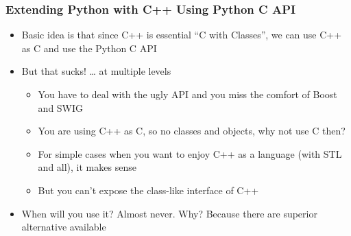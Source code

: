 \documentclass{beamer}
\begin{document}
\begin{frame}
\frametitle{Extending Python with C++ Using Python C API}
\label{sec-1_4}


\begin{itemize}
\item Basic idea is that since C++ is essential ``C with Classes'', we can use C++ as C and use the Python C API
\item But that sucks! \ldots{} at multiple levels
\begin{itemize}
\item You have to deal with the ugly API and you miss the comfort of Boost and SWIG
\item You are using C++ as C, so no classes and objects, why not use C then?
\item For simple cases when you want to enjoy C++ as a language (with STL and all), it makes sense
\item But you can't expose the class-like interface of C++
\end{itemize}
\item When will you use it?
     Almost never. Why? Because there are superior alternative available
\end{itemize}
\end{frame}
\end{document}
